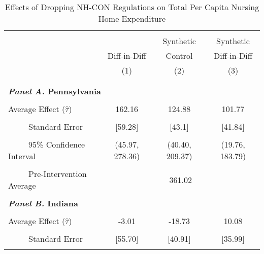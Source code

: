\documentclass[../Main.tex]{subfiles}
\begin{document}
\newpage
\null
\vfill
\begin{table}[htbp]\centering \footnotesize
\def\sym#1{\ifmmode^{#1}\else\(^{#1}\)\fi}
\captionsetup{width=.78\textwidth}
\caption{\centering Effects of Dropping NH-CON Regulations on Total Per Capita Nursing Home Expenditure}
\label{tab:ave_results_tot_exp}
\setlength{\tabcolsep}{10pt}
\begin{tabular}{l*{3}{c}}
\hline\hline
\\[-2ex]
&\multicolumn{1}{c}{}&\multicolumn{1}{c}{Synthetic}&\multicolumn{1}{c}{Synthetic}\\
&\multicolumn{1}{c}{Diff-in-Diff}&\multicolumn{1}{c}{Control}&\multicolumn{1}{c}{Diff-in-Diff}\\
&\multicolumn{1}{c}{(1)}&\multicolumn{1}{c}{(2)}&\multicolumn{1}{c}{(3)}\\
\\[-2ex]
\hline
\\[-.1ex]
\multicolumn{4}{l}{\textbf{\textit{Panel A.} Pennsylvania}}\\
\\[-1.5ex]
\multicolumn{1}{l}{Average Effect ($\hat{\tau}$)}&   \multicolumn{1}{c}{162.16}&   \multicolumn{1}{c}{124.88}&  \multicolumn{1}{c}{101.77}\\
\\[-2ex]
\multicolumn{1}{l}{\ \ \ \ \ Standard Error}  &\multicolumn{1}{c}{[59.28]}&\multicolumn{1}{c}{[43.1]}&\multicolumn{1}{c}{[41.84]}\\
\\[-2ex]
\multicolumn{1}{l}{\ \ \ \ \ 95\% Confidence Interval}&   \multicolumn{1}{c}{(45.97, 278.36)}&   \multicolumn{1}{c}{(40.40, 209.37)}&   \multicolumn{1}{c}{(19.76, 183.79)}\\
\\[-2ex]
\multicolumn{1}{l}{\ \ \ \ \ Pre-Intervention Average}&   \multicolumn{3}{c}{361.02}\\
\\[-.1ex]
\multicolumn{4}{l}{\textbf{\textit{Panel B.} Indiana}}\\
\\[-1.5ex]
\multicolumn{1}{l}{Average Effect ($\hat{\tau}$)}&   \multicolumn{1}{c}{-3.01}&   \multicolumn{1}{c}{-18.73}&  \multicolumn{1}{c}{10.08}\\
\\[-2ex]
\multicolumn{1}{l}{\ \ \ \ \ Standard Error}  &\multicolumn{1}{c}{[55.70]}&\multicolumn{1}{c}{[40.91]}&\multicolumn{1}{c}{[35.99]}\\
\\[-2ex]

\end{tabular}
\end{table}
\end{document}
